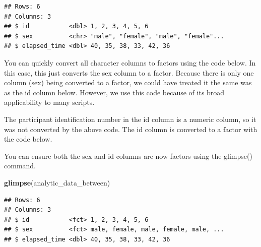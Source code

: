 \documentclass[
]{krantz}
\makeatletter
\newenvironment{Shaded}{\begin{snugshade}}{\end{snugshade}}
\newcommand{\DataTypeTok}[1]{\textcolor[rgb]{0.27,0.27,0.27}{#1}}
\newcommand{\KeywordTok}[1]{\textcolor[rgb]{0.27,0.27,0.27}{\textbf{#1}}}
\newcommand{\NormalTok}[1]{#1}
\newcommand{\OperatorTok}[1]{\textcolor[rgb]{0.43,0.43,0.43}{\textbf{#1}}}
\newcommand{\StringTok}[1]{\textcolor[rgb]{0.5,0.5,0.5}{#1}}
\newenvironment{kframe}{%
\medskip{}
\setlength{\fboxsep}{.8em}
 \def\at@end@of@kframe{}%
 \ifinner\ifhmode%
  \def\at@end@of@kframe{\end{minipage}}%
  \begin{minipage}{\columnwidth}%
 \fi\fi%
 \def\FrameCommand##1{\hskip\@totalleftmargin \hskip-\fboxsep
 \colorbox{shadecolor}{##1}\hskip-\fboxsep
     \hskip-\linewidth \hskip-\@totalleftmargin \hskip\columnwidth}%
 \MakeFramed {\advance\hsize-\width
   \@totalleftmargin\z@ \linewidth\hsize
   \@setminipage}}%
 {\par\unskip\endMakeFramed%
 \at@end@of@kframe}
\renewenvironment{Shaded}{\begin{kframe}}{\end{kframe}}
\makeatother
\begin{document}
\begin{verbatim}
## Rows: 6
## Columns: 3
## $ id           <dbl> 1, 2, 3, 4, 5, 6
## $ sex          <chr> "male", "female", "male", "female"...
## $ elapsed_time <dbl> 40, 35, 38, 33, 42, 36
\end{verbatim}

You can quickly convert all character columns to factors using the code below. In this case, this just converts the sex column to a factor. Because there is only one column (sex) being converted to a factor, we could have treated it the same was as the id column below. However, we use this code because of its broad applicability to many scripts.

\begin{Shaded}
\end{Shaded}

The participant identification number in the id column is a numeric column, so it was not converted by the above code. The id column is converted to a factor with the code below.

\begin{Shaded}
\end{Shaded}

You can ensure both the sex and id columns are now factors using the glimpse() command.

\begin{Shaded}
\begin{Highlighting}[]
\KeywordTok{glimpse}\NormalTok{(analytic_data_between)}
\end{Highlighting}
\end{Shaded}

\begin{verbatim}
## Rows: 6
## Columns: 3
## $ id           <fct> 1, 2, 3, 4, 5, 6
## $ sex          <fct> male, female, male, female, male, ...
## $ elapsed_time <dbl> 40, 35, 38, 33, 42, 36
\end{verbatim}
\end{document}
